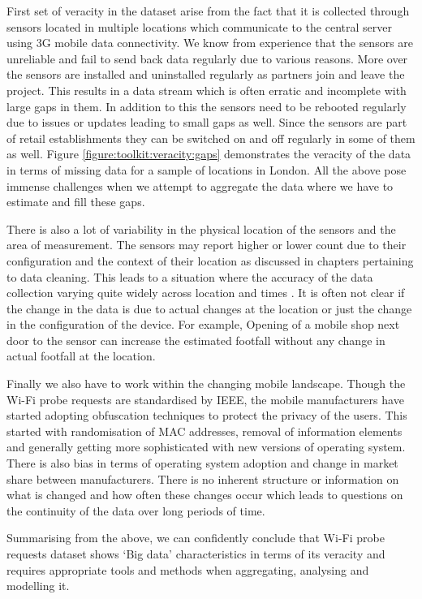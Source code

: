 First set of veracity in the dataset arise from the fact that it is collected through sensors located in multiple locations which communicate to the central server using 3G mobile data connectivity.
We know from experience that the sensors are unreliable and fail to send back data regularly due to various reasons.
More over the sensors are installed and uninstalled regularly as partners join and leave the project.
This results in a data stream which is often erratic and incomplete with large gaps in them.
In addition to this the sensors need to be rebooted regularly due to issues or updates leading to small gaps as well.
Since the sensors are part of retail establishments they can be switched on and off regularly in some of them as well.
Figure \ref{figure:toolkit:veracity:gaps} demonstrates the veracity of the data in terms of missing data for a sample of locations in London.
All the above pose immense challenges when we attempt to aggregate the data where we have to estimate and fill these gaps.

There is also a lot of variability in the physical location of the sensors and the area of measurement.
The sensors may report higher or lower count due to their configuration and the context of their location as discussed in chapters pertaining to data cleaning.
This leads to a situation where the accuracy of the data collection varying quite widely across location and times \cite{lugomer2017understanding}.
It is often not clear if the change in the data is due to actual changes at the location or just the change in the configuration of the device.
For example, Opening of a mobile shop next door to the sensor can increase the estimated footfall without any change in actual footfall at the location.

Finally we also have to work within the changing mobile landscape.
Though the Wi-Fi probe requests are standardised by IEEE, the mobile manufacturers have started adopting obfuscation techniques to protect the privacy of the users.
This started with randomisation of MAC addresses, removal of information elements and generally getting more sophisticated with new versions of operating system.
There is also bias in terms of operating system adoption and change in market share between manufacturers.
There is no inherent structure or information on what is changed and how often these changes occur which leads to questions on the continuity of the data over long periods of time.

Summarising from the above, we can confidently conclude that Wi-Fi probe requests dataset shows `Big data' characteristics in terms of its veracity and requires appropriate tools and methods when aggregating, analysing and modelling it.

